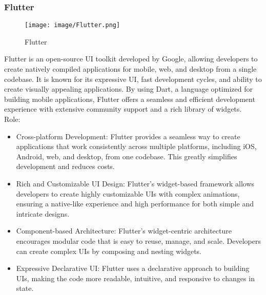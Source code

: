 \documentclass[conference]{IEEEtran}
\begin{document}
\subsubsection{Flutter}

\begin{figure}[h!]
    \centering
    \texttt{[image: image/Flutter.png]}
    \caption{Flutter}
    \label{fig:enter-label}
\end{figure}

\noindent Flutter is an open-source UI toolkit developed by Google, allowing developers to create natively compiled applications for mobile, web, and desktop from a single codebase. It is known for its expressive UI, fast development cycles, and ability to create visually appealing applications. By using Dart, a language optimized for building mobile applications, Flutter offers a seamless and efficient development experience with extensive community support and a rich library of widgets.\\

Role:
\begin{itemize}
    \item Cross-platform Development: Flutter provides a seamless way to create applications that work consistently across multiple platforms, including iOS, Android, web, and desktop, from one codebase. This greatly simplifies development and reduces costs.\\
    \item Rich and Customizable UI Design: Flutter's widget-based framework allows developers to create highly customizable UIs with complex animations, ensuring a native-like experience and high performance for both simple and intricate designs.\\
    \item Component-based Architecture: Flutter's widget-centric architecture encourages modular code that is easy to reuse, manage, and scale. Developers can create complex UIs by composing and nesting widgets.\\
    \item Expressive Declarative UI: Flutter uses a declarative approach to building UIs, making the code more readable, intuitive, and responsive to changes in state.\\
\end{itemize}
\end{document}
